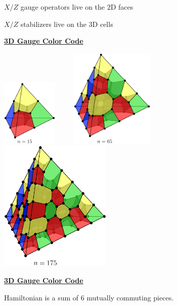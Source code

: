 \documentclass[11pt]{article}
\def\heading #1{\centerline{\underline{\bf\LARGE #1}}}
\def\vsp {\vspace*{0.5cm}}
\def\hsp {\ \ \ \ }
\begin{document}
$X/Z$ gauge operators live on the 2D faces

$X/Z$ stabilizers live on the 3D cells

\rightline{[Bombin2015]}

\newpage %

\heading{3D Gauge Color Code}

\vsp
\includegraphics[width=0.2\textwidth]{pic-gcolor-1.pdf}
\hsp
\includegraphics[width=0.3\textwidth]{pic-gcolor-2.pdf}
\hsp
\includegraphics[width=0.4\textwidth]{pic-gcolor-3.pdf}

\rightline{[Bombin2015]}


%
%
%

\newpage %

\heading{3D Gauge Color Code}

\vsp 
Hamiltonian is a sum of $6$ mutually commuting pieces.
\end{document}
